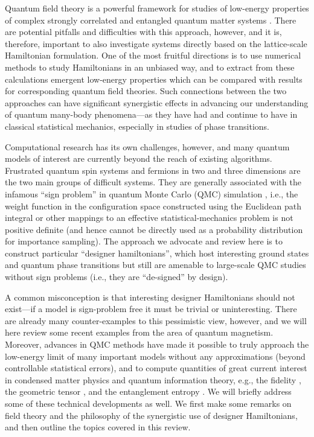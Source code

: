 \documentclass[range]{ar2e}
\begin{document}
Quantum field theory is a powerful framework for studies of low-energy properties of complex strongly 
correlated and entangled quantum matter systems \cite{Sachdev11}. There are potential pitfalls and difficulties 
with this approach, however, and it is, therefore, important to also investigate systems directly based on the 
lattice-scale Hamiltonian formulation. One of the most fruitful directions is to use numerical methods to study 
Hamiltonians in an unbiased way, and to extract from these calculations emergent low-energy properties which can be 
compared with results for corresponding quantum field theories. Such connections between the two approaches 
can have significant synergistic effects in advancing our understanding of quantum many-body phenomena---as they
have had and continue to have in classical statistical mechanics, especially in studies of phase transitions. 

Computational research has its own challenges, however, and many quantum models of interest are currently beyond the reach 
of existing algorithms. Frustrated quantum spin systems and fermions in two and three dimensions are the two main groups 
of difficult systems. They are generally associated with the infamous ``sign problem'' in quantum Monte Carlo (QMC) simulation
\cite{Loh90,Henelius00,Nyfeler08}, i.e., the weight function in the configuration space constructed using the Euclidean path 
integral or other mappings to an effective statistical-mechanics problem is not positive definite (and hence cannot be directly 
used as a probability distribution for importance sampling). The approach we advocate and review here is to construct particular 
``designer hamiltonians'', which host interesting ground states and quantum phase transitions but still are amenable to 
large-scale QMC studies without sign problems (i.e., they are ``de-signed'' by design). 

A common misconception is that interesting designer Hamiltonians should not exist---if a model is sign-problem 
free it must be trivial or uninteresting. There are already many counter-examples to this pessimistic view, 
however, and we will here review some recent examples from the area of quantum magnetism. Moreover, advances in QMC 
methods \cite{Sandvik91,Evertz93,Beard96,WormA,Sandvik99,Sandvik10a} have made it possible to truly approach the 
low-energy limit of many important models without any approximations (beyond controllable statistical errors), and to compute 
quantities of great current interest in condensed matter physics and quantum information theory, e.g., the fidelity 
\cite{Schwandt09}, the geometric tensor \cite{Degrandi11}, and the entanglement entropy \cite{Hastings10, Melko10}. We will 
briefly address some of these technical developments as well. We first make some remarks on field theory and the philosophy 
of the synergistic use of designer Hamiltonians, and then outline the topics covered in this review.
\end{document}
